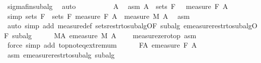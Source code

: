 \begin{isabellebody}
\ sigma{\isacharunderscore}{\kern0pt}fin{\isacharunderscore}{\kern0pt}subalg\ \isamarkupfalse%
\ auto\isanewline
\ \ \isacommand{{\isacharbraceleft}{\kern0pt}}\isamarkupfalse%
\ \isanewline
\ \ \ \ \isamarkupfalse%
\ A\ \isamarkupfalse%
\ asm{\isacharcolon}{\kern0pt}\ {\isachardoublequoteopen}A\ {\isasymin}\ sets\ {\isacharquery}{\kern0pt}F{\isachardoublequoteclose}\ {\isachardoublequoteopen}{}\ {\isacharless}{\kern0pt}\ measure\ {\isacharquery}{\kern0pt}F\ A{\isachardoublequoteclose}\isanewline
\ \ \ \ \isamarkupfalse%
\ {\isacharbrackleft}{\kern0pt}simp{\isacharbrackright}{\kern0pt}{\isacharcolon}{\kern0pt}\ {\isachardoublequoteopen}sets\ {\isacharquery}{\kern0pt}F\ {\isacharequal}{\kern0pt}\ sets\ F{\isachardoublequoteclose}\ {\isachardoublequoteopen}measure\ {\isacharquery}{\kern0pt}F\ A\ {\isacharequal}{\kern0pt}\ measure\ M\ A{\isachardoublequoteclose}\ \isamarkupfalse%
\ asm\ \isamarkupfalse%
\ {\isacharparenleft}{\kern0pt}auto\ simp\ add{\isacharcolon}{\kern0pt}\ measure{\isacharunderscore}{\kern0pt}def\ sets{\isacharunderscore}{\kern0pt}restr{\isacharunderscore}{\kern0pt}to{\isacharunderscore}{\kern0pt}subalg{\isacharbrackleft}{\kern0pt}OF\ subalg{\isacharbrackright}{\kern0pt}\ emeasure{\isacharunderscore}{\kern0pt}restr{\isacharunderscore}{\kern0pt}to{\isacharunderscore}{\kern0pt}subalg{\isacharbrackleft}{\kern0pt}OF\ subalg{\isacharbrackright}{\kern0pt}{\isacharparenright}{\kern0pt}\isanewline
\ \ \ \ \isamarkupfalse%
\ M{\isacharunderscore}{\kern0pt}A{\isacharcolon}{\kern0pt}\ {\isachardoublequoteopen}emeasure\ M\ A\ {\isacharless}{\kern0pt}\ {\isasyminfinity}{\isachardoublequoteclose}\ \isamarkupfalse%
\ measure{\isacharunderscore}{\kern0pt}zero{\isacharunderscore}{\kern0pt}top\ asm\ \isamarkupfalse%
\ {\isacharparenleft}{\kern0pt}force\ simp\ add{\isacharcolon}{\kern0pt}\ top{\isachardot}{\kern0pt}not{\isacharunderscore}{\kern0pt}eq{\isacharunderscore}{\kern0pt}extremum{\isacharparenright}{\kern0pt}\isanewline
\ \ \ \ \isamarkupfalse%
\ F{\isacharunderscore}{\kern0pt}A{\isacharcolon}{\kern0pt}\ {\isachardoublequoteopen}emeasure\ {\isacharquery}{\kern0pt}F\ A\ {\isacharless}{\kern0pt}\ {\isasyminfinity}{\isachardoublequoteclose}\ \isamarkupfalse%
\ asm{\isacharparenleft}{\kern0pt}{}{\isacharparenright}{\kern0pt}\ emeasure{\isacharunderscore}{\kern0pt}restr{\isacharunderscore}{\kern0pt}to{\isacharunderscore}{\kern0pt}subalg\ subalg\ \isamarkupfalse%

\end{isabellebody}
